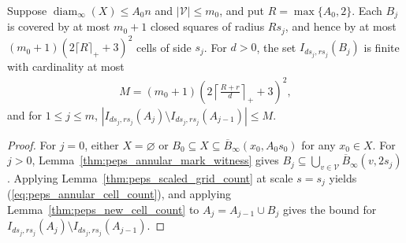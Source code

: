 \begin{lemma}
    \label{thm:peps_annular_cell_count}
    \leanok
    Suppose $\operatorname{diam}_{\infty}(X)\le A_0n$ and $|\mathcal V|\le m_0$,
    and put $R=\max\{A_0,2\}$. Each $B_j$ is covered by at most $m_0+1$ closed
    squares of radius $Rs_j$, and hence by at most
    $(m_0+1)(2\lceil R\rceil_++3)^2$ cells of side $s_j$. For $d>0$, the set
    $I_{ds_j,rs_j}(B_j)$ is finite with cardinality at most
    \begin{align}
        M=(m_0+1)\left(2\left\lceil\frac{R+r}{d}\right\rceil_++3\right)^2,
        \label{eq:peps_annular_cell_count}
    \end{align}
    and for $1\le j\le m$, $|I_{ds_j,rs_j}(A_j)\setminus I_{ds_j,rs_j}(A_{j-1})|\le M$.
\end{lemma}
\begin{proof}
    \leanok
    For $j=0$, either $X=\varnothing$ or $B_0\subseteq X\subseteq\overline B_\infty(x_0,A_0s_0)$
    for any $x_0\in X$. For $j>0$, Lemma~\ref{thm:peps_annular_mark_witness}
    gives $B_j\subseteq\bigcup_{v\in\mathcal V}\overline B_\infty(v,2s_j)$.
    Applying Lemma~\ref{thm:peps_scaled_grid_count} at scale $s=s_j$ yields
    (\ref{eq:peps_annular_cell_count}), and applying
    Lemma~\ref{thm:peps_new_cell_count} to $A_j=A_{j-1}\cup B_j$ gives the
    bound for $I_{ds_j,rs_j}(A_j)\setminus I_{ds_j,rs_j}(A_{j-1})$.
\end{proof}

